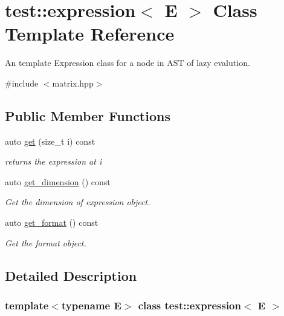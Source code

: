 \hypertarget{classtest_1_1expression}{}\section{test\+::expression$<$ E $>$ Class Template Reference}
\label{classtest_1_1expression}


An template Expression class for a node in A\+ST of lazy evalution.  




{\ttfamily \#include $<$matrix.\+hpp$>$}

\subsection*{Public Member Functions}
\begin{DoxyCompactItemize}
\item 
auto \mbox{\hyperlink{classtest_1_1expression_a8752a4a375aa68ee321d2312bc92f0c2}{get}} (size\+\_\+t i) const
\begin{DoxyCompactList}\small\item\em returns the expression at i \end{DoxyCompactList}\item 
auto \mbox{\hyperlink{classtest_1_1expression_aa9a3a5989c12512ff9d1703098c22eb5}{get\+\_\+dimension}} () const
\begin{DoxyCompactList}\small\item\em Get the dimension of expression object. \end{DoxyCompactList}\item 
auto \mbox{\hyperlink{classtest_1_1expression_a6e572103ab041dc6fb445801c0120816}{get\+\_\+format}} () const
\begin{DoxyCompactList}\small\item\em Get the format object. \end{DoxyCompactList}\end{DoxyCompactItemize}


\subsection{Detailed Description}
\subsubsection*{template$<$typename E$>$\newline
class test\+::expression$<$ E $>$}

